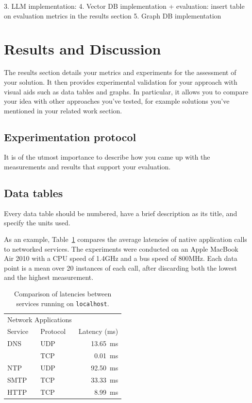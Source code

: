 \documentclass{scrartcl}
\begin{document}
3. LLM implementation:
4. Vector DB implementation + evaluation: insert table on evaluation metrics in the results section
5. Graph DB implementation


\section{Results and Discussion}

The results section details your metrics and experiments for the assessment of your solution. It then provides experimental validation for your approach with visual aids such as data tables and graphs. In particular, it allows you to compare your idea with other approaches you've tested, for example solutions you've mentioned in your related work section.

\subsection{Experimentation protocol}

It is of the utmost importance to describe how you came up with the measurements and results that support your evaluation.

\subsection{Data tables}

Every data table should be numbered, have a brief description as its title, and specify the units used.

As an example, Table~\ref{tab:my_label} compares the average latencies of native application calls to networked services. The experiments were conducted on an Apple MacBook Air 2010 with a CPU speed of 1.4GHz and a bus speed of 800MHz. Each data point is a mean over 20 instances of each call, after discarding both the lowest and the highest measurement.

\begin{table}[ht]
    \centering
    \begin{tabular}{llr}
\hline
\multicolumn{2}{c}{Network Applications} \\
\cline{1-2}
Service    & Protocol & Latency (\si{\ms}) \\
\hline
DNS         & UDP       & \SI{13.65}{\ms}      \\
            & TCP       & \SI{0.01}{\ms}       \\
NTP         & UDP       & \SI{92.50}{\ms}      \\
SMTP        & TCP       & \SI{33.33}{\ms}      \\
HTTP        & TCP       & \SI{8.99}{\ms}       \\
\hline
\end{tabular}
    \caption{Comparison of latencies between services running on \texttt{localhost}.}
    \label{tab:my_label}
\end{table}
\end{document}
